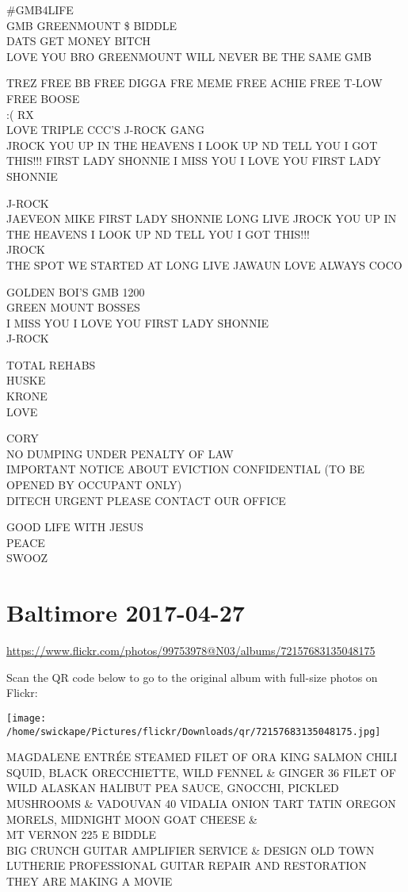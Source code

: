 \documentclass[10pt,letterpaper]{article}
\begin{document}
\#GMB4LIFE\\
GMB GREENMOUNT \$ BIDDLE\\
DATS GET MONEY BITCH\\
LOVE YOU BRO GREENMOUNT WILL NEVER BE THE SAME GMB

TREZ FREE BB FREE DIGGA FRE MEME FREE ACHIE FREE T{-}LOW FREE BOOSE\\
:( RX\\
LOVE TRIPLE CCC'S J{-}ROCK GANG\\
JROCK YOU UP IN THE HEAVENS I LOOK UP ND TELL YOU I GOT THIS!!! FIRST LADY SHONNIE I MISS YOU I LOVE YOU FIRST LADY SHONNIE

J{-}ROCK\\
JAEVEON MIKE FIRST LADY SHONNIE LONG LIVE JROCK YOU UP IN THE HEAVENS I LOOK UP ND TELL YOU I GOT THIS!!!\\
JROCK\\
THE SPOT WE STARTED AT LONG LIVE JAWAUN LOVE ALWAYS COCO

GOLDEN BOI'S GMB 1200\\
GREEN MOUNT BOSSES\\
I MISS YOU I LOVE YOU FIRST LADY SHONNIE\\
J{-}ROCK

TOTAL REHABS\\
HUSKE\\
KRONE\\
LOVE

CORY\\
NO DUMPING UNDER PENALTY OF LAW\\
IMPORTANT NOTICE ABOUT EVICTION CONFIDENTIAL (TO BE OPENED BY OCCUPANT ONLY)\\
DITECH URGENT PLEASE CONTACT OUR OFFICE

GOOD LIFE WITH JESUS\\
PEACE\\
SWOOZ


\section*{Baltimore 2017-04-27}

\url{https://www.flickr.com/photos/99753978@N03/albums/72157683135048175}

Scan the QR code below to go to the original album with full-size photos on Flickr:

\texttt{[image: /home/swickape/Pictures/flickr/Downloads/qr/72157683135048175.jpg]}


MAGDALENE ENTRÉE STEAMED FILET OF ORA KING SALMON CHILI SQUID, BLACK ORECCHIETTE, WILD FENNEL \& GINGER 36 FILET OF WILD ALASKAN HALIBUT PEA SAUCE, GNOCCHI, PICKLED MUSHROOMS \& VADOUVAN 40 VIDALIA ONION TART TATIN OREGON MORELS, MIDNIGHT MOON GOAT CHEESE \&\\
MT VERNON 225 E BIDDLE\\
BIG CRUNCH GUITAR AMPLIFIER SERVICE \& DESIGN OLD TOWN LUTHERIE PROFESSIONAL GUITAR REPAIR AND RESTORATION\\
THEY ARE MAKING A MOVIE
\end{document}

